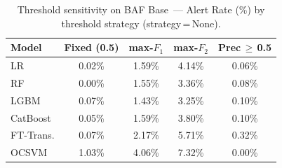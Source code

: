 \begin{table}[ht!]
\centering
\caption{Threshold sensitivity on BAF Base~--- Alert Rate (\%) by threshold strategy (strategy\,=\,None).}
\label{tab:threshold_baf_alert}
\begin{tabular}{l c c c c}
\toprule
Model & Fixed (0.5) & max-$F_1$ & max-$F_2$ & Prec\,$\geq$\,0.5 \\
\midrule
LR         & 0.02\% & 1.59\% & 4.14\% & 0.06\% \\
RF         & 0.00\% & 1.55\% & 3.36\% & 0.08\% \\
LGBM       & 0.07\% & 1.43\% & 3.25\% & 0.10\% \\
CatBoost   & 0.05\% & 1.59\% & 3.80\% & 0.10\% \\
FT-Trans.  & 0.07\% & 2.17\% & 5.71\% & 0.32\% \\
OCSVM      & 1.03\% & 4.06\% & 7.32\% & 0.00\% \\
\bottomrule
\end{tabular}
\end{table}